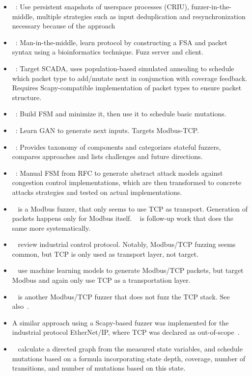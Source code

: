 \documentclass{article}
\let\savedCite=\cite
\renewcommand{\cite}{\unskip~\savedCite}
\begin{document}
\begin{multicols}{2}
\begin{itemize}
    \item {}\cite{FitM}: Use persistent snapshots of userspace processes (CRIU), fuzzer-in-the-middle, multiple strategies such as input deduplication and resynchronization necessary because of the approach
    \item {}\cite{Autofuzz}: Man-in-the-middle, learn protocol by constructing a FSA and packet syntax using a bioinformatics technique. Fuzz server and client.
    \item {}\cite{EPF}: Target SCADA, uses population-based simulated annealing to schedule which packet type to add/mutate next in conjunction with coverage feedback. Requires Scapy-compatible implementation of packet types to ensure packet structure.
    \item {}\cite{ModelBased}: Build FSM and minimize it, then use it to schedule basic mutations.
    \item {}\cite{GANFuzz}: Learn GAN to generate next inputs. Targets Modbus-TCP.
    \item {}\cite{StatefulReview}: Provides taxonomy of components and categorizes stateful fuzzers, compares approaches and lists challenges and future directions.
    \item {}\cite{Congestion}: Manual FSM from RFC to generate abstract attack models against congestion control implementations, which are then transformed to concrete attacks strategies and tested on actual implementations.
    \item {}\cite{ModbusTCP} is a Modbus fuzzer, that only seems to use TCP as transport. Generation of packets happens only for Modbus itself. \cite{MTFStorm} is follow-up work that does the same more systematically.
    \item {}\cite{IndustrialReview} review industrial control protocol. Notably, Modbus/TCP fuzzing seems common, but TCP is only used as transport layer, not target.

    \item {}\cite{MTA} use machine learning models to generate Modbus/TCP packets, but target Modbus and again only use TCP as a transportation layer.
    \item {}\cite{AnotherModbusTCP} is another Modbus/TCP fuzzer that does not fuzz the TCP stack. See also\cite{ModbusTCP2}.
    \item A similar approach using a Scapy-based fuzzer was implemented for the industrial protocol EtherNet/IP, where TCP was declared as out-of-scope\cite{ENIP}.
    \item {}\cite{StateMachine} calculate a directed graph from the measured state variables, and schedule mutations based on a formula incorporating state depth, coverage, number of transitions, and number of mutations based on this state.
  \end{itemize}


\end{multicols}
\end{document}
